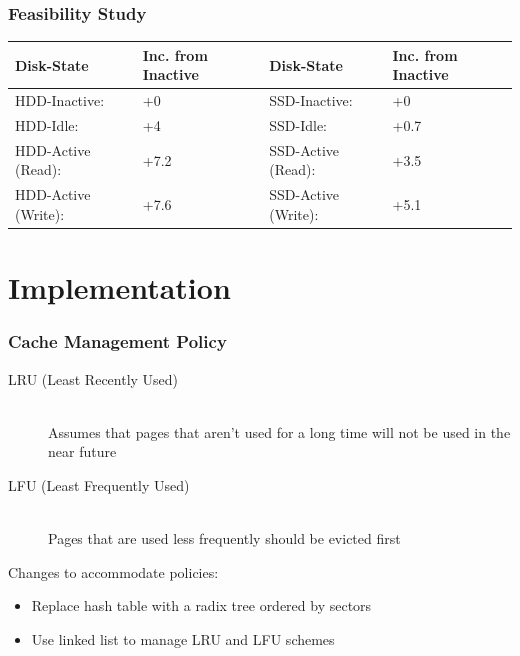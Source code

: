 \documentclass{beamer}
\begin{document}
\begin{frame}
  \frametitle{Feasibility Study}

  \resizebox{\textwidth}{!}
  {
    \begin{tabular}{|l|l|l|l|}
      \hline
      \bf Disk-State      & \bf Inc. from Inactive & \bf Disk-State      & \bf Inc. from Inactive \\ \hline
      HDD-Inactive:       & +0                     & SSD-Inactive:       & +0                     \\ \hline
      HDD-Idle:           & +4                     & SSD-Idle:           & +0.7                   \\ \hline
      HDD-Active (Read):  & +7.2                   & SSD-Active (Read):  & +3.5                   \\ \hline
      HDD-Active (Write): & +7.6                   & SSD-Active (Write): & +5.1                   \\ \hline
    \end{tabular}
  }

\end{frame}

\section{Implementation}

\begin{frame}
  \frametitle{Cache Management Policy}

  \begin{description}
    \item[LRU (Least Recently Used)] \hfill \\
    Assumes that pages that aren't used for a long time will not be used in the
    near future
    \item[LFU (Least Frequently Used)] \hfill \\
    Pages that are used less frequently should be evicted first
  \end{description}

  Changes to accommodate policies:
  \begin{itemize}
    \item Replace hash table with a radix tree ordered by sectors
    \item Use linked list to manage LRU and LFU schemes
  \end{itemize}

\end{frame}
\end{document}
